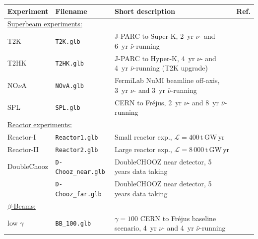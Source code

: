 \begin{table}[tbp]
\begin{center}
\begin{tabular}{llp{7.5cm}c}
\hline
Experiment & Filename & Short description &  Ref. \\[0.2cm]
\hline 
\multicolumn{4}{l}{\underline{Superbeam experiments:}} \\[0.2cm]

T2K & {\tt T2K.glb} & J-PARC to Super-K, 2~yr $\nu$- and 6~yr 
$\bar{\nu}$-running &  \cite{Itow:2001ee,Huber:2002mx} \\[0.2cm]

T2HK & {\tt T2HK.glb} & J-PARC to Hyper-K, 4~yr $\nu$- and 4~yr 
$\bar{\nu}$-running (T2K upgrade) &  \cite{Itow:2001ee,Huber:2002mx} \\[0.2cm]

NO$\nu$A & {\tt NOvA.glb} & FermiLab NuMI beamline off-axis, 3~yr $\nu$- and 
3~yr $\bar{\nu}$-running  & \cite{Ambats:2004js,Yang_2004} \\[0.2cm]

SPL & {\tt SPL.glb} & CERN to Fr\'{e}jus, 2~yr $\nu$- and 8~yr 
$\bar{\nu}$-running & \cite{Campagne:2006yx,Campagne:2004wt,Mezzetto:2003mm} \\[0.2cm]

\multicolumn{4}{l}{\underline{Reactor experiments:}} \\[0.2cm]

{\sc Reactor-I} & {\tt Reactor1.glb} & Small reactor exp., 
$\mathcal{L} = 400 \, \mathrm{t} \, \mathrm{GW} \, \mathrm{yr}$
& \cite{Huber:2003pm} \\[0.2cm]

{\sc Reactor-II} & {\tt Reactor2.glb} & Large reactor exp., 
$\mathcal{L} = 8\, 000 \, \mathrm{t} \, \mathrm{GW} \, \mathrm{yr}$ 
& \cite{Huber:2003pm} \\[0.2cm]

Double{\sc Chooz} & {\tt D-Chooz\_near.glb} & DoubleCHOOZ near 
detector, 5 years data taking & \cite{Huber:2006vr} \\ 
 & {\tt D-Chooz\_far.glb} & DoubleCHOOZ near detector, 5 years data taking & \\[0.2cm]

\multicolumn{4}{l}{\underline{$\beta$-Beams:}} \\[0.2cm]

low $\gamma$ & {\tt BB\_100.glb} & $\gamma=100$ CERN to Fr\'{e}jus baseline 
scenario, 4~yr $\nu$- and 4~yr $\bar{\nu}$-running & \cite{Campagne:2006yx} \\[0.2cm]


\end{tabular}
\end{center}
\end{table}
